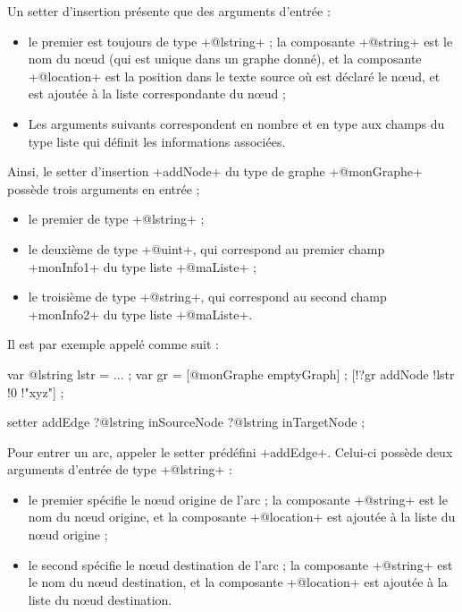 Un setter d'insertion présente que des arguments d'entrée :
\begin{itemize}
  \item le premier est toujours de type \ggs+@lstring+ ; la composante \ggs+@string+ est le nom du nœud (qui est unique dans un graphe donné), et la composante \ggs+@location+ est la position dans le texte source où est déclaré le nœud, et est ajoutée à la liste correspondante du nœud ;
  \item Les arguments suivants correspondent en nombre et en type aux champs du type liste qui définit les informations associées.
\end{itemize}

Ainsi, le setter d'insertion \ggs+addNode+ du type de graphe \ggs+@monGraphe+ possède trois arguments en entrée ;
\begin{itemize}
  \item le premier de type \ggs+@lstring+ ;
  \item le deuxième de type \ggs+@uint+, qui correspond au premier champ \ggs+monInfo1+ du type liste \ggs+@maListe+ ;
  \item le troisième de type \ggs+@string+, qui correspond au second champ \ggs+monInfo2+ du type liste \ggs+@maListe+.
\end{itemize}

Il est par exemple appelé comme suit :
\begin{galgascode}
var @lstring lstr = ... ;
var gr = [@monGraphe emptyGraph] ;
[!?gr addNode !lstr !0 !"xyz"] ;
\end{galgascode}





\begin{galgascode}
setter addEdge ?@lstring inSourceNode ?@lstring inTargetNode ;
\end{galgascode}

Pour entrer un arc, appeler le setter prédéfini \ggs+addEdge+. Celui-ci possède deux arguments d'entrée de type \ggs+@lstring+ :
\begin{itemize}
  \item le premier spécifie le nœud origine de l'arc ; la composante \ggs+@string+ est le nom du nœud origine, et la composante \ggs+@location+ est ajoutée à la liste du nœud origine ;
  \item le second spécifie le nœud destination de l'arc ; la composante \ggs+@string+ est le nom du nœud destination, et la composante \ggs+@location+ est ajoutée à la liste du nœud destination.
\end{itemize}







